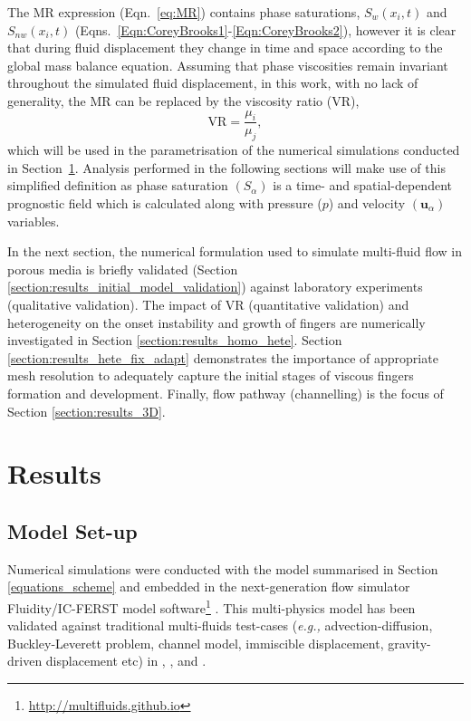 \documentclass[preprint,authoryear,12pt]{elsarticle}
\newcommand{\frc}{\displaystyle\frac}
\newcommand{\eg}{{\it e.g., }}
\begin{document}
The MR expression (Eqn.~\ref{eq:MR}) contains phase saturations, $S_{w}\left(x_{i},t\right)$ and  $S_{nw}\left(x_{i},t\right)$ (Eqns.~\ref{Eqn:CoreyBrooks1}-\ref{Eqn:CoreyBrooks2}), however it is clear that during fluid displacement they change in time and space according to the global mass balance equation. Assuming that phase viscosities remain invariant throughout the simulated fluid displacement, in this work, with no lack of generality, the MR can be replaced by the viscosity ratio (VR),
\begin{displaymath} 
    \text{VR} = \frc{\mu_{i}}{\mu_{j}},
\end{displaymath}
which will be used in the parametrisation of the numerical simulations conducted in Section~\ref{section:results}. Analysis performed in the following sections will make use of this simplified definition as phase saturation $\left(S_{\alpha}\right)$ is a time- and spatial-dependent prognostic field which is calculated along with pressure ($p$) and velocity $\left(\mathbf{u}_{\alpha}\right)$ variables.

\medskip
In the next section, the numerical formulation used to simulate multi-fluid flow in porous media is briefly validated (Section \ref{section:results_initial_model_validation}) against laboratory experiments (qualitative validation). The impact of VR (quantitative validation) and heterogeneity on the onset instability and growth of fingers are numerically investigated in Section \ref{section:results_homo_hete}. Section \ref{section:results_hete_fix_adapt} demonstrates the importance of appropriate mesh resolution to adequately capture the initial stages of viscous fingers formation and development. Finally, flow pathway (channelling) is the focus of Section \ref{section:results_3D}.


\section{Results}\label{section:results} 

\subsection{Model Set-up}\label{section:results_setup} 
Numerical simulations were conducted with the model summarised in Section \ref{equations_scheme} and embedded in the next-generation flow simulator Fluidity/IC-FERST model software\footnote{\href{http://multifluids.github.io}{http://multifluids.github.io}} \citep[a full description of the model can be found in][]{gomes_2017,salinas_2018}. This multi-physics model has been validated against traditional multi-fluids test-cases (\eg advection-diffusion, Buckley-Leverett problem, channel model, immiscible displacement, gravity-driven displacement etc) in \citet{radunz_2014}, \citet{jackson_2015}, \citet{salinas2015} and \citet{pavlidis2016}.
 
\end{document}
